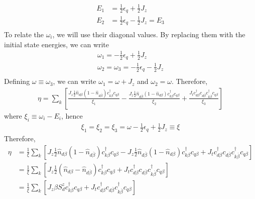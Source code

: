 \documentclass[twoside]{report}
\numberwithin{equation}{section}
\begin{document}
\begin{equation}\begin{aligned}
	E_1 &= \frac{1}{2}\epsilon_q + \frac{1}{2}J_z\\
	E_2 &= \frac{1}{2}\epsilon_q - \frac{1}{2}J_z = E_3\\
\end{aligned}\end{equation}
To relate the \(\omega_i\), we will use their diagonal values. By replacing them with the initial state energies, we can write
\begin{equation}\begin{aligned}
	\omega_1 = - \frac{1}{2}\epsilon_q + \frac{1}{2}J_z\\
	\omega_2 = \omega_3 = - \frac{1}{2}\epsilon_q - \frac{1}{2}J_z\\
\end{aligned}\end{equation}
Defining \(\omega \equiv \omega_3\), we can write \(\omega_1 = \omega + J_z\) and \(\omega_2 = \omega\). Therefore,
\begin{equation}\begin{aligned}
	\eta = \sum_k \left[\frac{ J_z \frac{1}{2}\hat n_{d\beta}\left( 1 - \hat n_{d\overline\beta} \right) c^\dagger_{k\beta}c_{q\beta}}{\xi_1} - \frac{J_z \frac{1}{2}\hat n_{d\overline\beta}\left( 1 - \hat n_{d\beta} \right) c^\dagger_{k\beta}c_{q\beta}}{\xi_2} + \frac{J_t  c^\dagger_{d\beta}c_{d\overline\beta} c^\dagger_{k\overline\beta}c_{q\beta}}{\xi_3}\right] 
\end{aligned}\end{equation}
where \(\xi_i \equiv \omega_i - E_i\), hence
\begin{equation}\begin{aligned}
	\xi_1 = \xi_2 = \xi_3 = \omega - \frac{1}{2}\epsilon_q + \frac{1}{2}J_z \equiv \xi
\end{aligned}\end{equation}
Therefore,
\begin{equation}\begin{aligned}
	\eta &= \frac{1}{\xi}\sum_k \left[ J_z \frac{1}{2}\hat n_{d\beta}\left( 1 - \hat n_{d\overline\beta} \right) c^\dagger_{k\beta}c_{q\beta} - J_z \frac{1}{2}\hat n_{d\overline\beta}\left( 1 - \hat n_{d\beta} \right) c^\dagger_{k\beta}c_{q\beta} + J_t  c^\dagger_{d\beta}c_{d\overline\beta} c^\dagger_{k\overline\beta}c_{q\beta}\right] \\
	     &= \frac{1}{\xi}\sum_k \left[ J_z \frac{1}{2}\left(\hat n_{d\beta} - \hat n_{d\overline\beta}\right) c^\dagger_{k\beta}c_{q\beta} + J_t  c^\dagger_{d\beta}c_{d\overline\beta} c^\dagger_{k\overline\beta}c_{q\beta}\right]\\
	     &= \frac{1}{\xi}\sum_k \left[ J_z \beta S_d^z c^\dagger_{k\beta}c_{q\beta} + J_t  c^\dagger_{d\beta}c_{d\overline\beta} c^\dagger_{k\overline\beta}c_{q\beta}\right]
\end{aligned}\end{equation}
\end{document}
